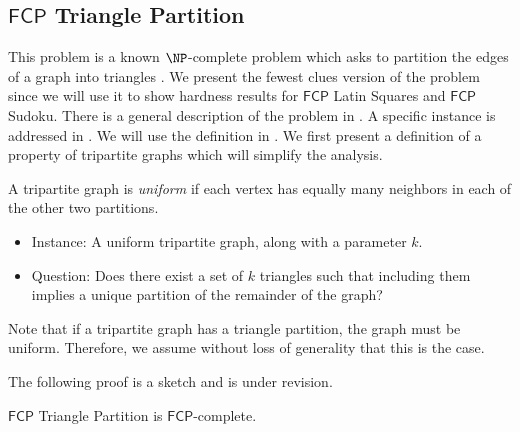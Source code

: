\documentclass[runningheads,a4paper]{llncs}
\begin{document}
\subsection{$\mathsf{FCP}$ Triangle Partition}

This problem is a known $\NP$-complete problem which asks to partition the edges of a graph into triangles \cite{holyer1981np}. We present the fewest clues version of the problem since we will use it to show hardness results for $\mathsf{FCP}$ Latin Squares and $\mathsf{FCP}$ Sudoku. There is a general description of the problem in \cite{holyer1981np}. A specific instance is addressed in \cite{colbourn1984complexity}. We will use the definition in \cite{colbourn1984complexity}. We first present a definition of a property of tripartite graphs which will simplify the analysis.

\begin{definition}
A tripartite graph is \emph{uniform} if each vertex has equally many neighbors in each of the other two partitions.
\end{definition}

\begin{itemize}
\item Instance: A uniform tripartite graph, along with a parameter $k$.
\item Question: Does there exist a set of $k$ triangles such that including them implies a unique partition of the remainder of the graph?
\end{itemize}

Note that if a tripartite graph has a triangle partition, the graph must be uniform. Therefore, we assume without loss of generality that this is the case. 

The following proof is a sketch and is under revision.

\begin{theorem}
$\mathsf{FCP}$ Triangle Partition is $\mathsf{FCP}$-complete.
\end{theorem}
\end{document}
